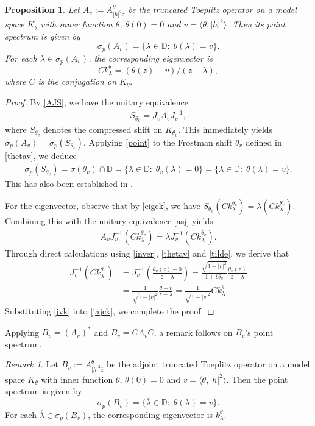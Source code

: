 \documentclass[12pt,reqno]{amsart}
\newtheorem{prop}[thm]{Proposition}
\theoremstyle{definition}
\theoremstyle{remark}
\newtheorem{rem}[thm]{Remark}
\numberwithin{equation}{section}
\newcommand{\la}{\langle}
\newcommand{\ra}{\rangle}
\newcommand{\ol}{\overline}
\begin{document}
  \begin{prop}\label{prop ps}  Let $A_v:=A_{|h|^2 z}^\theta$ be the truncated Toeplitz operator on  a model space $K_\theta$ with inner function $\theta$, $\theta(0)=0$ and $v=\la \theta, |h|^2 \ra$. Then its point spectrum is  given by $$\sigma_p(A_v)=\{\lambda\in \mathbb{D}:\;\theta(\lambda)=v\}.$$ For each $\lambda\in \sigma_p(A_v)$, the corresponding eigenvector is $$Ck_\lambda^\theta=(\theta(z)-v)/(z-\lambda),$$ where $C$ is the conjugation on $K_\theta.$\end{prop}
\begin{proof} By  \eqref{AJS}, we have the unitary equivalence
\begin{align} S_{\theta_v}=J_vA_vJ_v^{-1},\label{asj} \end{align} where $S_{\theta_v}$ denotes the compressed shift on $K_{\theta_v}.$ This immediately yields  $\sigma_p(A_v)=\sigma_p(S_{\theta_v}).$ Applying  \eqref{point} to the Frostman shift $\theta_v$ defined in \eqref{thetav}, we deduce \begin{align*} \sigma_p(S_{\theta_v})=\sigma(\theta_v)\cap \mathbb{D}=\{\lambda\in \mathbb{D}:\;\theta_v(\lambda)=0\}=\{\lambda\in \mathbb{D}:\;\theta(\lambda)=v\}.  \end{align*}
This has also been established in \cite[Theorem 14.1]{Sarason1}.

For the eigenvector, observe that by \eqref{eigek}, we have $S_{\theta_v}(Ck_\lambda^{\theta_v})=\lambda (Ck_\lambda^{\theta_v}).$ Combining this with the unitary equivalence \eqref{asj} yields
\begin{align}  A_v J_v^{-1}(Ck_\lambda^{\theta_v})=\lambda J_v^{-1} (Ck_\lambda^{\theta_v}).\label{jajck} \end{align} Through direct calculations using \eqref{inver}, \eqref{thetav} and \eqref{tilde}, we derive that\begin{align}J_v^{-1}(Ck_\lambda^{\theta_v})
&=J_v^{-1}\left(\frac{\theta_v(z)-0}{z-\lambda}\right)
=\frac{\sqrt{1-|v|^2}}{1+\ol{v}\theta_v}\frac{\theta_v(z) }{z-\lambda}\nonumber\\&=\frac{1}{\sqrt{1-|v|^2}} \frac{\theta-v}{z-\lambda}=\frac{1}{\sqrt{1-|v|^2}}Ck_\lambda^\theta.\label{jvk}
\end{align} Substituting \eqref{jvk} into \eqref{jajck}, we complete the proof.
\end{proof}
Applying $B_v=(A_v)^*$ and $B_v=CA_vC$,   a remark follows on $B_v$'s  point spectrum.

\begin{rem} \label{rem ps}  Let $B_v:=A_{|h|^2 \bar{z}}^\theta$ be the adjoint truncated Toeplitz operator on a model space $K_\theta$ with  inner function $\theta$, $\theta(0)=0$ and $v=\la \theta, |h|^2 \ra$.  Then the point spectrum is given by $$\sigma_p(B_v)=\{\ol{\lambda}\in \mathbb{D}:\;\theta(\lambda)=v\}.$$ For each $\ol{\lambda}\in \sigma_p(B_v)$, the corresponding eigenvector is $k_\lambda^\theta.$ \end{rem}
\end{document}
